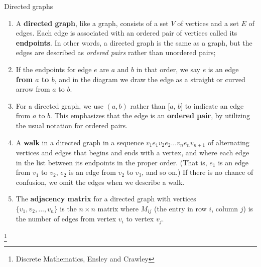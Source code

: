     \begin{intro}{Directed graphs}
        \begin{enumerate}
            \item   A \textbf{directed graph}, like a graph, consists of
                    a set $V$ of vertices and a set $E$ of edges.
                    Each edge is associated with an ordered pair of
                    vertices called its \textbf{endpoints}.
                    In other words, a directed graph is the same as a graph,
                    but the edges are described as \textit{ordered pairs}
                    rather than unordered pairs;

            \item   If the endpoints for edge $e$ are $a$ and $b$ in that order,
                    we say $e$ is an edge \textbf{from $a$ to $b$}, and
                    in the diagram we draw the edge as a straight or curved
                    arrow from $a$ to $b$.

            \item   For a directed graph, we use $(a,b)$ rather than
                    [$a$, $b$] to indicate an edge from $a$ to $b$.
                    This emphasizes that the edge is an \textbf{ordered pair},
                    by utilizing the usual notation for ordered pairs.

            \item   A \textbf{walk} in a directed graph in a sequence
                    $v_{1}e_{1} v_{2}e_{2} ... v_{n}e_{n} v_{n+1}$
                    of alternating vertices and edges that begins and
                    ends with a vertex, and where each edge in the
                    list between its endpoints in the proper order.
                    (That is, $e_{1}$ is an edge from $v_{1}$ to $v_{2}$,
                    $e_{2}$ is an edge from $v_{2}$ to $v_{3}$, and so on.)
                    If there is no chance of confusion, we omit the
                    edges when we describe a walk.

            \item   The \textbf{adjacency matrix} for a directed graph
                    with vertices \\ $\{ v_{1}, v_{2}, ..., v_{n} \}$ is
                    the $n \times n$ matrix where $M_{ij}$ (the entry
                    in row $i$, column $j$) is the number of edges
                    from vertex $v_{i}$ to vertex $v_{j}$.
        \end{enumerate}
        \footnote{Discrete Mathematics, Ensley and Crawley}
    \end{intro}

